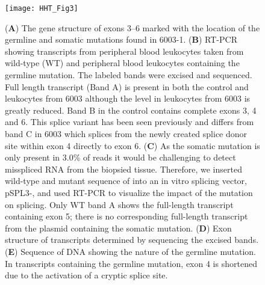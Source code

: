 \begin{figure}[tbp!]
\begin{center}
\texttt{[image: HHT\_Fig3]}
\end{center}

\caption[Mutations in  Disrupt Splicing]{(\textbf{A}) The gene structure of  exons 3--6 marked with the location of the germline and somatic mutations found in 6003-1. (\textbf{B}) RT-PCR showing  transcripts from peripheral blood leukocytes taken from wild-type (WT) and peripheral blood leukocytes containing the germline mutation. The labeled bands were excised and sequenced. Full length transcript (Band A) is present in both the control and leukocytes from 6003 although the level in leukocytes from 6003 is greatly reduced.  Band B in the control contains complete exons 3, 4 and 6.  This splice variant has been seen previously and differs from band C in 6003 which splices from the newly created splice donor site within exon 4 directly to exon 6. (\textbf{C}) As the somatic mutation is only present in 3.0\% of reads it would be challenging to detect misspliced RNA from the biopsied tissue. Therefore, we inserted wild-type and mutant sequence of  into an in vitro splicing vector, pSPL3-, and used RT-PCR to visualize the impact of the mutation on splicing. Only WT band A shows the full-length transcript containing exon 5; there is no corresponding full-length transcript from the plasmid containing the somatic mutation. (\textbf{D}) Exon structure of  transcripts determined by sequencing the excised bands. (\textbf{E}) Sequence of DNA showing the nature of the germline mutation. In  transcripts containing the germline mutation, exon 4 is shortened due to the activation of a cryptic splice site. }

\label{HHT_Figure_3}
\end{figure}

